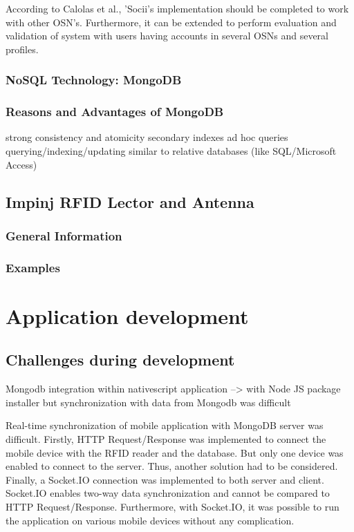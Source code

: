 According to Calolas et al., 'Socii's implementation should be completed to work with other OSN's. Furthermore, it can be extended to perform evaluation and validation of system with users having accounts in several OSNs and several profiles. 

\subsubsection{NoSQL Technology: MongoDB}\label{mongodb}
\subsubsection{Reasons and Advantages of MongoDB}

\cite{mongodb_edward}

strong consistency and atomicity
secondary indexes 
ad hoc queries
querying/indexing/updating similar to relative databases (like SQL/Microsoft Access)

\subsection{Impinj RFID Lector and Antenna}

\subsubsection{General Information}

\subsubsection{Examples}

%
%
\section{Application development} \label{app_development}

\subsection{Challenges during development}

Mongodb integration within nativescript application 
--> with Node JS package installer 
but synchronization with data from Mongodb was difficult

Real-time synchronization of mobile application with MongoDB server was difficult. Firstly, HTTP Request/Response was implemented to connect the mobile device with the RFID reader and the database. But only one device was enabled to connect to the server. Thus, another solution had to be considered. Finally, a Socket.IO connection was implemented to both server and client. Socket.IO enables two-way data synchronization and cannot be compared to HTTP Request/Response. Furthermore, with Socket.IO, it was possible to run the application on various mobile devices without any complication. 

